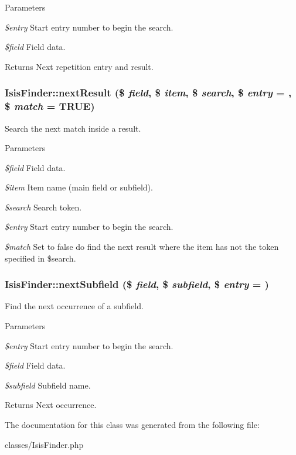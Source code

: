 \begin{DoxyParams}{Parameters}
\item[{\em \$entry}]Start entry number to begin the search.\item[{\em \$field}]Field data.\end{DoxyParams}
\begin{DoxyReturn}{Returns}
Next repetition entry and result. 
\end{DoxyReturn}
\hypertarget{classIsisFinder_af965ba4acae18aa61bc4a3242bcdadfc}{
\subsubsection[{nextResult}]{\setlength{\rightskip}{0pt plus 5cm}IsisFinder::nextResult (\$ {\em field}, \/  \$ {\em item}, \/  \$ {\em search}, \/  \$ {\em entry} = {}, \/  \$ {\em match} = {\ttfamily TRUE})}}
\label{classIsisFinder_af965ba4acae18aa61bc4a3242bcdadfc}
Search the next match inside a result.


\begin{DoxyParams}{Parameters}
\item[{\em \$field}]Field data.\item[{\em \$item}]Item name (main field or subfield).\item[{\em \$search}]Search token.\item[{\em \$entry}]Start entry number to begin the search.\item[{\em \$match}]Set to false do find the next result where the item has not the token specified in \$search. \end{DoxyParams}
\hypertarget{classIsisFinder_aa367980783d341197e003684a639ff1a}{
\subsubsection[{nextSubfield}]{\setlength{\rightskip}{0pt plus 5cm}IsisFinder::nextSubfield (\$ {\em field}, \/  \$ {\em subfield}, \/  \$ {\em entry} = {})}}
\label{classIsisFinder_aa367980783d341197e003684a639ff1a}
Find the next occurrence of a subfield.


\begin{DoxyParams}{Parameters}
\item[{\em \$entry}]Start entry number to begin the search.\item[{\em \$field}]Field data.\item[{\em \$subfield}]Subfield name.\end{DoxyParams}
\begin{DoxyReturn}{Returns}
Next occurrence. 
\end{DoxyReturn}


The documentation for this class was generated from the following file:\begin{DoxyCompactItemize}
\item 
classes/IsisFinder.php\end{DoxyCompactItemize}

